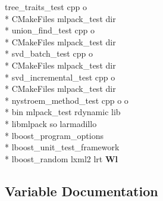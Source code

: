 \begin{DoxyCompactItemize}
tree\-\_\-traits\-\_\-test cpp o \\*
C\-Make\-Files mlpack\-\_\-test dir \\*
union\-\_\-find\-\_\-test cpp o \\*
C\-Make\-Files mlpack\-\_\-test dir \\*
svd\-\_\-batch\-\_\-test cpp o \\*
C\-Make\-Files mlpack\-\_\-test dir \\*
svd\-\_\-incremental\-\_\-test cpp o \\*
C\-Make\-Files mlpack\-\_\-test dir \\*
nystroem\-\_\-method\-\_\-test cpp o o \\*
bin mlpack\-\_\-test rdynamic lib \\*
libmlpack so larmadillo \\*
lboost\-\_\-program\-\_\-options \\*
lboost\-\_\-unit\-\_\-test\-\_\-framework \\*
lboost\-\_\-random lxml2 lrt {\bf Wl}
\end{DoxyCompactItemize}


\subsection{Variable Documentation}
